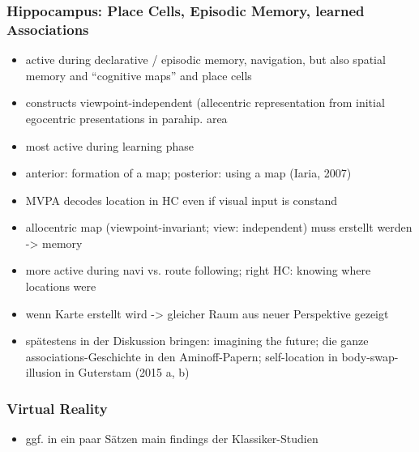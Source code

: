 \documentclass[10pt,a4paper,twocolumn]{article}
\begin{document}
\subsubsection*{Hippocampus: Place Cells, Episodic Memory, learned Associations}
\begin{itemize}
	\item active during declarative / episodic memory, navigation, but also
	spatial memory and ``cognitive maps'' and place cells
	\item constructs viewpoint-independent (allecentric representation from
	initial egocentric presentations in parahip. area
	\item most active during learning phase \citep{wolbers_2005_retrosplenial_hippocampal_contributions}
	\item anterior: formation of a map; posterior: using a map (Iaria, 2007)
	\item MVPA decodes location in HC even if visual input is constand
	\item allocentric map (viewpoint-invariant; view: independent) muss erstellt
	werden -> memory
	\item more active during navi vs. route following; right HC: knowing where
	locations were \citep{maguire_1998_knowing_where_and_getting_there}
	\item wenn Karte erstellt wird -> gleicher Raum aus neuer Perspektive gezeigt
	\citep{barense_2010_medial_temproal_effects_viewpoint}
	\item spätestens in der Diskussion bringen: imagining the future; die ganze
	associations-Geschichte in den Aminoff-Papern; self-location in body-swap-illusion
	in Guterstam (2015 a, b)
\end{itemize}

\subsubsection*{Virtual Reality}
\begin{itemize}
	\item ggf. in ein paar Sätzen main findings der Klassiker-Studien
\end{itemize}
\end{document}
